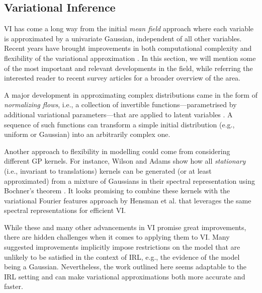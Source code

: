 \documentclass{mpaper}
\begin{document}
\subsection{Variational Inference}

VI has come a long way from the initial \emph{mean field} approach where each
variable is approximated by a univariate Gaussian, independent of all other
variables. Recent years have brought improvements in both computational
complexity and flexibility of the variational approximation
\cite{blei2017variational}. In this section, we will mention some of the most
important and relevant developments in the field, while referring the interested
reader to recent survey articles
\cite{blei2017variational,DBLP:journals/corr/abs-1711-05597} for a broader
overview of the area.

A major development in approximating complex distributions came in the form of
\emph{normalizing flows}, i.e., a collection of invertible
functions---parametrised by additional variational parameters---that are applied
to latent variables \cite{DBLP:conf/icml/RezendeM15}. A sequence of such
functions can transform a simple initial distribution (e.g., uniform or
Gaussian) into an arbitrarily complex one.

Another approach to flexibility in modelling could come from considering
different GP kernels. For instance, Wilson and Adams \cite{pmlr-v28-wilson13}
show how all \emph{stationary} (i.e., invariant to translations) kernels can be
generated (or at least approximated) from a mixture of Gaussians in their
spectral representation using Bochner's theorem
\cite{bochner1959lectures,DBLP:journals/technometrics/Woodard00}. It looks
promising to combine these kernels with the variational Fourier features
approach by Hensman et al. \cite{DBLP:journals/jmlr/HensmanDS17} that leverages
the same spectral representations for efficient VI.

While these and many other advancements in VI promise great improvements, there
are hidden challenges when it comes to applying them to VI. Many suggested
improvements implicitly impose restrictions on the model that are unlikely to be
satisfied in the context of IRL, e.g., the evidence of the model being a
Gaussian. Nevertheless, the work outlined here seems adaptable to the IRL
setting and can make variational approximations both more accurate and faster.
\end{document}
